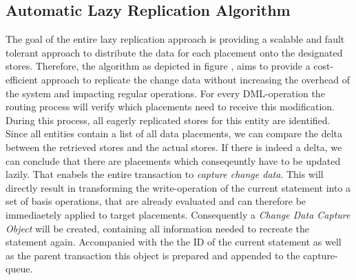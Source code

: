 
\subsection{Automatic Lazy Replication Algorithm}
\label{sec:algo}


The goal of the entire lazy replication approach is providing a scalable and fault tolerant approach to distribute the data for each placement onto the designated stores.
Therefore, the algorithm as depicted in figure , aims to provide a cost-efficient approach to replicate the change data without increasing 
the overhead of the system and impacting regular operations. 
For every DML-operation the routing process will verify which placements need to receive this modification. During this process, all eagerly replicated stores for this entity
are identified. Since all entities contain a list of all data placements, we can compare the delta between the retrieved stores and the actual stores. 
If there is indeed a delta, we can conclude that there are placements which conseqeuntly have to be updated lazily. 
That enabels the entire transaction to \emph{capture change data}. This will directly result in transforming the write-operation of the current statement into a set of basis 
operations, that are already evaluated and can therefore be immediaetely applied to target placements. Consequently a \emph{Change Data Capture Object} will be created, 
containing all information needed to recreate the statement again. Accompanied with the the ID of the current statement as well as the parent transaction this object is prepared
and appended to the capture-queue.\\

